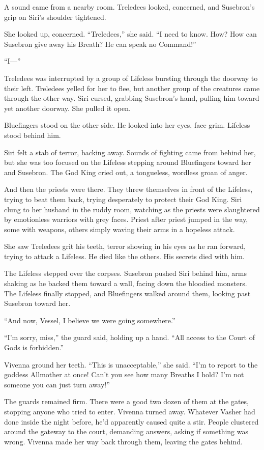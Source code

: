 A sound came from a nearby room. Treledees looked, concerned, and Susebron’s grip on Siri’s shoulder tightened.

She looked up, concerned. “Treledees,” she said. “I need to know. How? How can Susebron give away his Breath? He can speak no Command!”

“I—”

Treledees was interrupted by a group of Lifeless bursting through the doorway to their left. Treledees yelled for her to flee, but another group of the creatures came through the other way. Siri cursed, grabbing Susebron’s hand, pulling him toward yet another doorway. She pulled it open.

Bluefingers stood on the other side. He looked into her eyes, face grim. Lifeless stood behind him.

Siri felt a stab of terror, backing away. Sounds of fighting came from behind her, but she was too focused on the Lifeless stepping around Bluefingers toward her and Susebron. The God King cried out, a tongueless, wordless groan of anger.

And then the priests were there. They threw themselves in front of the Lifeless, trying to beat them back, trying desperately to protect their God King. Siri clung to her husband in the ruddy room, watching as the priests were slaughtered by emotionless warriors with grey faces. Priest after priest jumped in the way, some with weapons, others simply waving their arms in a hopeless attack.

She saw Treledees grit his teeth, terror showing in his eyes as he ran forward, trying to attack a Lifeless. He died like the others. His secrets died with him.

The Lifeless stepped over the corpses. Susebron pushed Siri behind him, arms shaking as he backed them toward a wall, facing down the bloodied monsters. The Lifeless finally stopped, and Bluefingers walked around them, looking past Susebron toward her.

“And now, Vessel, I believe we were going somewhere.”

\orn

“I’m sorry, miss,” the guard said, holding up a hand. “All access to the Court of Gods is forbidden.”

Vivenna ground her teeth. “This is unacceptable,” she said. “I’m to report to the goddess Allmother at once! Can’t you see how many Breaths I hold? I’m not someone you can just turn away!”

The guards remained firm. There were a good two dozen of them at the gates, stopping anyone who tried to enter. Vivenna turned away. Whatever Vasher had done inside the night before, he’d apparently caused quite a stir. People clustered around the gateway to the court, demanding answers, asking if something was wrong. Vivenna made her way back through them, leaving the gates behind.


